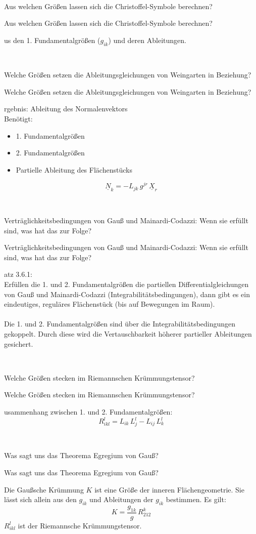 \documentclass[DIV=1]{scrartcl}
\newcommand{\frage}[3][10]{
    \newpage
    \ 
    \vspace{#1 em}
    \begin{framed}
        #2
    \end{framed}
    \newpage
    \begin{framed}
        #2
    \end{framed}
    \vspace{2 em}
}
\begin{document}
\frage{Aus welchen Größen lassen sich die Christoffel-Symbole berechnen?}

Aus den 1. Fundamentalgrößen ($g_{ik}$) und deren Ableitungen.



\frage{Welche Größen setzen die Ableitungsgleichungen von Weingarten in Beziehung?}

Ergebnis: Ableitung des Normalenvektors\\
Benötigt:
\begin{itemize}
    \item 1. Fundamentalgrößen
    \item 2. Fundamentalgrößen
    \item Partielle Ableitung des Flächenstücks
\end{itemize}
\[
    \underline{N}_k = - L_{jk} \, g^{jr} \, \underline{X}_r
\]



\frage{Verträglichkeitsbedingungen von Gauß und Mainardi-Codazzi: Wenn sie erfüllt sind, was hat das zur Folge?}

Satz 3.6.1:\\
Erfüllen die 1. und 2. Fundamentalgrößen die partiellen Differentialgleichungen von Gauß und Mainardi-Codazzi (Integrabilitätsbedingungen), dann gibt es ein eindeutiges, reguläres Flächenstück (bis auf Bewegungen im Raum).\\
\\
Die 1. und 2. Fundamentalgrößen sind über die Integrabilitätsbedingungen gekoppelt. Durch diese wird die Vertauschbarkeit höherer partieller Ableitungen gesichert.



\frage{Welche Größen stecken im Riemannschen Krümmungstensor?}

Zusammenhang zwischen 1. und 2. Fundamentalgrößen:
\[
    R_{ikl}^l = L_{ik} \, L_j^l - L_{ij} \, L_k^l
\]



\frage{Was sagt uns das Theorema Egregium von Gauß?}

\textit{Die Gaußsche Krümmung $K$ ist eine Größe der inneren Flächen\-geometrie. Sie lässt sich allein aus den $g_{ik}$ und Ableitungen der $g_{ik}$ bestimmen. Es gilt:}
\[
    K = \frac{g_{1k}}{g} \, R_{212}^k
\]
$R_{ikl}^l$ ist der Riemannsche Krümmungstensor.
\end{document}
